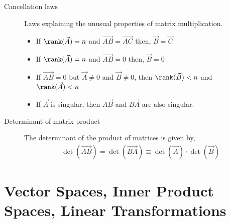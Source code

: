 \begin{description}
    \item[Cancellation laws] Laws explaining the unusual properties of matrix
        multiplication.
        \begin{itemize}
            \item If $ \rank(\vec{A}) = n $ and $ \vec{AB} = \vec{AC} $ then,
                  $ \vec{B} = \vec{C} $
            \item If $ \rank(\vec{A}) = n $ and $ \vec{AB} = 0 $ then,
                  $ \vec{B} = 0 $
            \item  If $ \vec{AB} = 0 $ but $ \vec{A} \neq 0 $ and $ \vec{B} \neq 0 $,
                  then $ \rank(\vec{B}) < n $ and $ \rank(\vec{A}) < n $
            \item If $ \vec{A} $ is singular, then $ \vec{AB} $ and $ \vec{BA} $ are
                  also singular.
        \end{itemize}

    \item[Determinant of matrix product] The determinant of the product of matrices
        is given by,
        \begin{align}
            \det(\vec{AB}) = \det(\vec{BA}) \equiv \det(\vec{A}) \cdot \det(\vec{B})
        \end{align}
\end{description}

\section{Vector Spaces, Inner Product Spaces, Linear Transformations}

